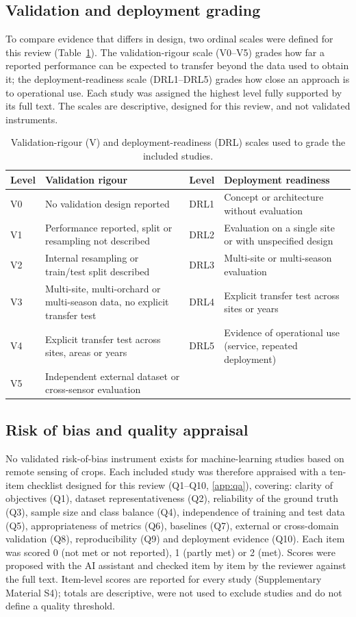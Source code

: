 \documentclass[preprint,12pt]{elsarticle}
\begin{document}
\subsection{Validation and deployment grading}
To compare evidence that differs in design, two ordinal scales were defined for this review (Table~\ref{tab:scales}). The validation-rigour scale (V0--V5) grades how far a reported performance can be expected to transfer beyond the data used to obtain it; the deployment-readiness scale (DRL1--DRL5) grades how close an approach is to operational use. Each study was assigned the highest level fully supported by its full text. The scales are descriptive, designed for this review, and not validated instruments.
\begin{table}[H]\centering\caption{Validation-rigour (V) and deployment-readiness (DRL) scales used to grade the included studies.}\label{tab:scales}\small
\begin{tabular}{@{}p{0.91cm}p{5.14cm}p{0.99cm}p{4.97cm}@{}}\toprule
Level & Validation rigour & Level & Deployment readiness\\\midrule
V0 & No validation design reported & DRL1 & Concept or architecture without evaluation\\
V1 & Performance reported, split or resampling not described & DRL2 & Evaluation on a single site or with unspecified design\\
V2 & Internal resampling or train/test split described & DRL3 & Multi-site or multi-season evaluation\\
V3 & Multi-site, multi-orchard or multi-season data, no explicit transfer test & DRL4 & Explicit transfer test across sites or years\\
V4 & Explicit transfer test across sites, areas or years & DRL5 & Evidence of operational use (service, repeated deployment)\\
V5 & Independent external dataset or cross-sensor evaluation & & \\\bottomrule
\end{tabular}\end{table}
 
\subsection{Risk of bias and quality appraisal}
No validated risk-of-bias instrument exists for machine-learning studies based on remote sensing of crops. Each included study was therefore appraised with a ten-item checklist designed for this review (Q1--Q10, \ref{app:qa}), covering: clarity of objectives (Q1), dataset representativeness (Q2), reliability of the ground truth (Q3), sample size and class balance (Q4), independence of training and test data (Q5), appropriateness of metrics (Q6), baselines (Q7), external or cross-domain validation (Q8), reproducibility (Q9) and deployment evidence (Q10). Each item was scored 0 (not met or not reported), 1 (partly met) or 2 (met). Scores were proposed with the AI assistant and checked item by item by the reviewer against the full text. Item-level scores are reported for every study (Supplementary Material S4); totals are descriptive, were not used to exclude studies and do not define a quality threshold.
 
\end{document}
